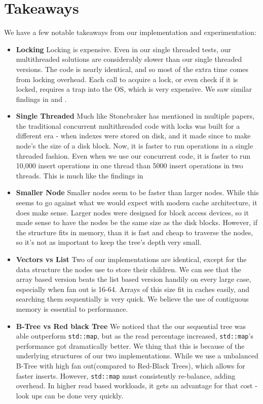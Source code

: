 \documentclass{sig-alternate}
\begin{document}
\section{Takeaways}
We have a few notable takeaways from our implementation and experimentation:
\begin{itemize}
\item \textbf{Locking} Locking is expensive.  Even in our single threaded tests, our multithreaded solutions are considerably slower than our single threaded versions.  The code is nearly identical, and so most of the extra time comes from locking overhead.  Each call to acquire a lock, or even check if it is locked, requires a trap into the OS, which is very expensive.  We saw similar findings in \cite{stone:oltp} and \cite{stone:era}.

\item \textbf{Single Threaded} Much like Stonebraker has mentioned in multiple papers, the traditional concurrent multithreaded code with locks was built for a different era - when indexes were stored on disk, and it made since to make node's the size of a disk block.  Now, it is faster to run operations in a single threaded fashion.  Even when we use our concurrent code, it is faster to run 10,000 insert operations in one thread than 5000 insert operations in two threads.  This is much like the findings in \cite{stone:era}

\item \textbf{Smaller Node} Smaller nodes seem to be faster than larger nodes.  While this seems to go against what we would expect with modern cache architecture, it does make sense.  Larger nodes were designed for block access devices, so it made sense to have the nodes be the same size as the disk blocks.  However, if the structure fits in memory, than it is fast and cheap to traverse the nodes, so it's not as important to keep the tree's depth very small.

\item \textbf{Vectors vs List} Two of our implementations are identical, except for the data structure the nodes use to store their children.  We can see that the array based version beats the list based version handily on every large case, especially when fan out is 16-64.  Arrays of this size fit in caches easily, and searching them sequentially is very quick.  We believe the use of contiguous memory is essential to performance.

\item \textbf{B-Tree vs Red black Tree} We noticed that the our sequential tree was able outperform \texttt{std::map}, but as the read percentage increased, \texttt{std::map}'s performance got dramatically better.  We thing that this is because of the underlying structures of our two implementations.  While we use a unbalanced B-Tree with high fan out(compared to Red-Black Trees), which allows for faster inserts.  However, \texttt{std::map} must consistently re-balance, adding overhead.  In higher read based workloads, it gets an advantage for that cost - look ups can be done very quickly.

\end{itemize}
\end{document}
